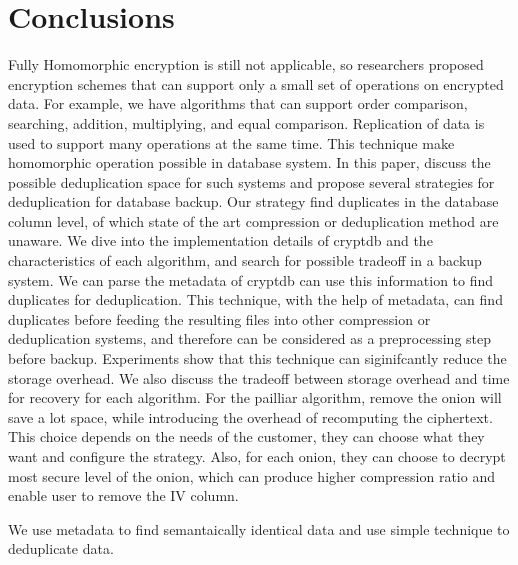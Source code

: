 



\section{Conclusions}

Fully Homomorphic encryption is still not applicable, so researchers proposed encryption schemes that can support only a small set of operations on encrypted data. For example, we have algorithms that can support order comparison, searching, addition, multiplying, and equal comparison. Replication of data is used to support many operations at the same time. This technique make homomorphic operation possible in database system. In this paper, discuss the possible deduplication space for such systems and propose several strategies for deduplication for database backup. Our strategy find duplicates in the database column level, of which state of the art compression or deduplication method are unaware. We dive into the implementation details of cryptdb and the characteristics of each algorithm, and search for possible tradeoff in a backup system. We can parse the metadata of cryptdb can use this information to find duplicates for deduplication. This technique, with the help of metadata, can find duplicates before feeding the resulting files into other compression or deduplication systems, and therefore can be considered as a preprocessing step before backup. Experiments show that this technique can siginifcantly reduce the storage overhead. We also discuss the tradeoff between storage overhead and time for recovery for each algorithm. For the pailliar algorithm, remove the onion will save a lot space, while introducing the overhead of recomputing the ciphertext. This choice depends on the needs of the customer, they can choose what they want and configure the strategy. Also, for each onion, they can choose to decrypt most secure level of the onion, which can produce higher compression ratio and enable user to remove the IV column. 

We use metadata to find semantaically identical data and use simple technique to deduplicate data.

